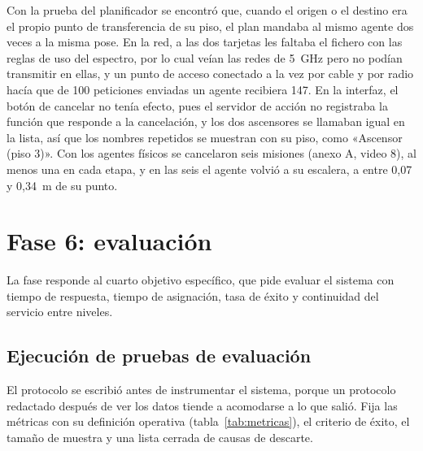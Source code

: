 Con la prueba del planificador se encontró que, cuando el origen o el destino era el propio punto de transferencia de su piso, el plan mandaba al mismo agente dos veces a la misma pose. En la red, a las dos tarjetas les faltaba el fichero con las reglas de uso del espectro, por lo cual veían las redes de 5~GHz pero no podían transmitir en ellas, y un punto de acceso conectado a la vez por cable y por radio hacía que de 100 peticiones enviadas un agente recibiera 147. En la interfaz, el botón de cancelar no tenía efecto, pues el servidor de acción no registraba la función que responde a la cancelación, y los dos ascensores se llamaban igual en la lista, así que los nombres repetidos se muestran con su piso, como «Ascensor (piso 3)». Con los agentes físicos se cancelaron seis misiones (anexo A, video 8), al menos una en cada etapa, y en las seis el agente volvió a su escalera, a entre 0,07 y 0,34~m de su punto.

\section{Fase 6: evaluación}
\label{sec:protocolo}

La fase responde al cuarto objetivo específico, que pide evaluar el sistema con tiempo de respuesta, tiempo de asignación, tasa de éxito y continuidad del servicio entre niveles.

\subsection{Ejecución de pruebas de evaluación}

El protocolo se escribió antes de instrumentar el sistema, porque un protocolo redactado después de ver los datos tiende a acomodarse a lo que salió. Fija las métricas con su definición operativa (tabla~\ref{tab:metricas}), el criterio de éxito, el tamaño de muestra y una lista cerrada de causas de descarte.

